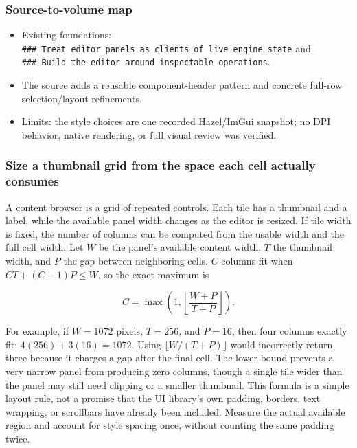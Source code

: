 \subsubsection{Source-to-volume map}\label{06-engine-ii-ch032-source-to-volume-map-3}

\begin{itemize}
\tightlist
\item
  Existing foundations: \texttt{\#\#\#\ Treat\ editor\ panels\ as\ clients\ of\ live\ engine\ state} and \texttt{\#\#\#\ Build\ the\ editor\ around\ inspectable\ operations}.
\item
  The source adds a reusable component-header pattern and concrete full-row selection/layout refinements.
\item
  Limits: the style choices are one recorded Hazel/ImGui snapshot; no DPI behavior, native rendering, or full visual review was verified.
\end{itemize}

\subsubsection{Size a thumbnail grid from the space each cell actually consumes}\label{06-engine-ii-ch032-size-a-thumbnail-grid-from-the-space-each-cell-actually-consumes}

A content browser is a grid of repeated controls. Each tile has a thumbnail and a label, while the available panel width changes as the editor is resized. If tile width is fixed, the number of columns can be computed from the usable width and the full cell width. Let \(W\) be the panel's available content width, \(T\) the thumbnail width, and \(P\) the gap between neighboring cells. \(C\) columns fit when \(CT+(C-1)P\leq W\), so the exact maximum is

\[
C = \max\left(1,\left\lfloor\frac{W+P}{T+P}\right\rfloor\right).
\]

For example, if \(W=1072\) pixels, \(T=256\), and \(P=16\), then four columns exactly fit: \(4(256)+3(16)=1072\). Using \(\lfloor W/(T+P)\rfloor\) would incorrectly return three because it charges a gap after the final cell. The lower bound prevents a very narrow panel from producing zero columns, though a single tile wider than the panel may still need clipping or a smaller thumbnail. This formula is a simple layout rule, not a promise that the UI library's own padding, borders, text wrapping, or scrollbars have already been included. Measure the actual available region and account for style spacing once, without counting the same padding twice.

